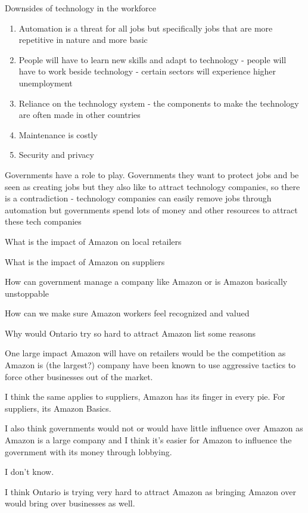 \documentclass[11pt]{article}
\begin{document}
Downsides of technology in the workforce

\begin{enumerate}
    \setlength{\itemsep}{0pt}
    \setlength{\parskip}{0pt}
    \item Automation is a threat for all jobs but specifically jobs that are more repetitive in nature and more basic
    \item People will have to learn new skills and adapt to technology - people will have to work beside technology - certain sectors will experience higher unemployment
    \item Reliance on the technology system - the components to make the technology are often made in other countries
    \item Maintenance is costly
    \item Security and privacy
\end{enumerate}

Governments have a role to play. Governments they want to protect jobs and be seen as creating jobs but they also like to attract technology companies, so there is a contradiction - technology companies can easily remove jobs through automation but governments spend lots of money and other resources to attract these tech companies

What is the impact of Amazon on local retailers

What is the impact of Amazon on suppliers

How can government manage a company like Amazon or is Amazon basically unstoppable

How can we make sure Amazon workers feel recognized and valued

Why would Ontario try so hard to attract Amazon list some reasons

One large impact Amazon will have on retailers would be the competition as Amazon is (the largest?) company have been known to use aggressive tactics to force other businesses out of the market. 

I think the same applies to suppliers, Amazon has its finger in every pie. For suppliers, its Amazon Basics. 

I also think governments would not or would have little influence over Amazon as Amazon is a large company and I think it's easier for Amazon to influence the government with its money through lobbying.

I don't know.

I think Ontario is trying very hard to attract Amazon as bringing Amazon over would bring over businesses as well. 
\end{document}
